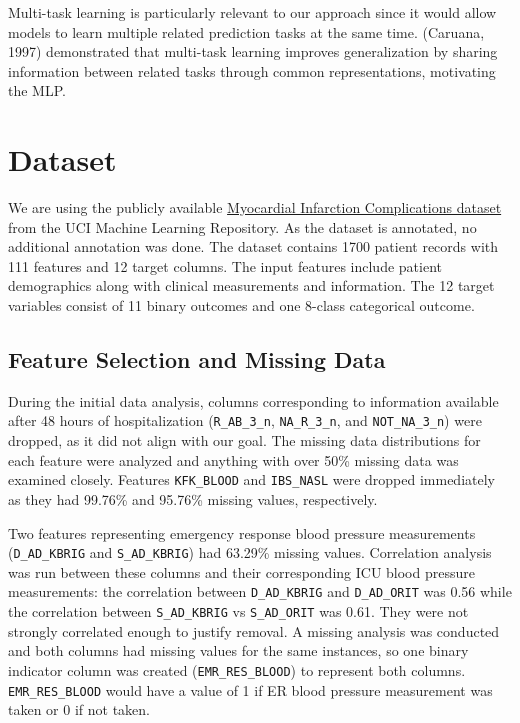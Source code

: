 \documentclass[11pt]{article}
\begin{document}
Multi-task learning is particularly relevant to our approach since it would allow models to learn multiple related prediction tasks at the same time. (Caruana, 1997) demonstrated that multi-task learning improves generalization by sharing information between related tasks through common representations, motivating the MLP.


\section{Dataset}

We are using the publicly available \href{https://archive.ics.uci.edu/dataset/579/myocardial+infarction+complications}{Myocardial Infarction Complications dataset} from the UCI Machine Learning Repository. As the dataset is annotated, no additional annotation was done. The dataset contains 1700 patient records with 111 features and 12 target columns. The input features include patient demographics along with clinical measurements and information. The 12 target variables consist of 11 binary outcomes and one 8-class categorical outcome.

\subsection{Feature Selection and Missing Data}

During the initial data analysis, columns corresponding to information available after 48 hours of hospitalization (\texttt{R\_AB\_3\_n}, \texttt{NA\_R\_3\_n}, and \texttt{NOT\_NA\_3\_n}) were dropped, as it did not align with our goal. The missing data distributions for each feature were analyzed and anything with over 50\% missing data was examined closely. Features \texttt{KFK\_BLOOD} and \texttt{IBS\_NASL} were dropped immediately as they had 99.76\% and 95.76\% missing values, respectively.

Two features representing emergency response blood pressure measurements (\texttt{D\_AD\_KBRIG} and \texttt{S\_AD\_KBRIG}) had 63.29\% missing values. Correlation analysis was run between these columns and their corresponding ICU blood pressure measurements: the correlation between \texttt{D\_AD\_KBRIG} and \texttt{D\_AD\_ORIT} was 0.56 while the correlation between \texttt{S\_AD\_KBRIG} vs \texttt{S\_AD\_ORIT} was 0.61. They were not strongly correlated enough to justify removal. A missing analysis was conducted and both columns had missing values for the same instances, so one binary indicator column was created (\texttt{EMR\_RES\_BLOOD}) to represent both columns. \texttt{EMR\_RES\_BLOOD} would have a value of 1 if ER blood pressure measurement was taken or 0 if not taken.
\end{document}
